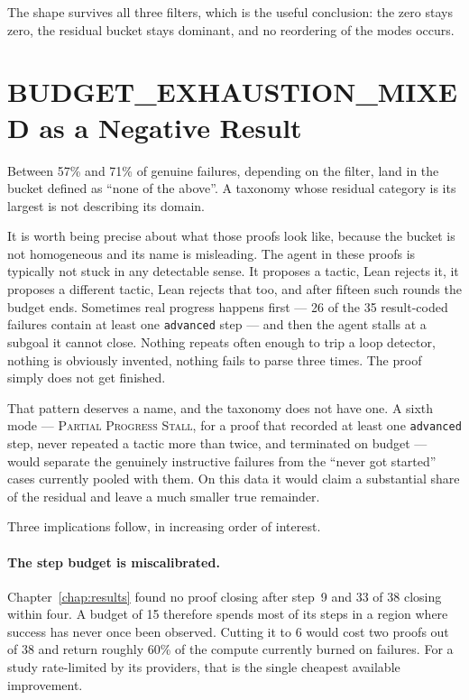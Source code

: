 The shape survives all three filters, which is the useful conclusion: the zero
stays zero, the residual bucket stays dominant, and no reordering of the modes
occurs.

\section{BUDGET\_EXHAUSTION\_MIXED as a Negative Result}
\label{sec:ft_negative}

Between 57\% and 71\% of genuine failures, depending on the filter, land in the
bucket defined as ``none of the above''. A taxonomy whose residual category is
its largest is not describing its domain.

It is worth being precise about what those proofs look like, because the bucket
is not homogeneous and its name is misleading. The agent in these proofs is
typically not stuck in any detectable sense. It proposes a tactic, Lean rejects
it, it proposes a different tactic, Lean rejects that too, and after fifteen
such rounds the budget ends. Sometimes real progress happens first --- 26 of the
35 result-coded failures contain at least one \texttt{advanced} step --- and
then the agent stalls at a subgoal it cannot close. Nothing repeats often enough
to trip a loop detector, nothing is obviously invented, nothing fails to parse
three times. The proof simply does not get finished.

That pattern deserves a name, and the taxonomy does not have one. A sixth mode
--- \textsc{Partial Progress Stall}, for a proof that recorded at least one
\texttt{advanced} step, never repeated a tactic more than twice, and terminated
on budget --- would separate the genuinely instructive failures from the
``never got started'' cases currently pooled with them. On this data it would
claim a substantial share of the residual and leave a much smaller true
remainder.

Three implications follow, in increasing order of interest.

\paragraph{The step budget is miscalibrated.}
Chapter~\ref{chap:results} found no proof closing after step~9 and 33 of 38
closing within four. A budget of 15 therefore spends most of its steps in a
region where success has never once been observed. Cutting it to 6 would cost
two proofs out of 38 and return roughly 60\% of the compute currently burned on
failures. For a study rate-limited by its providers, that is the single
cheapest available improvement.


